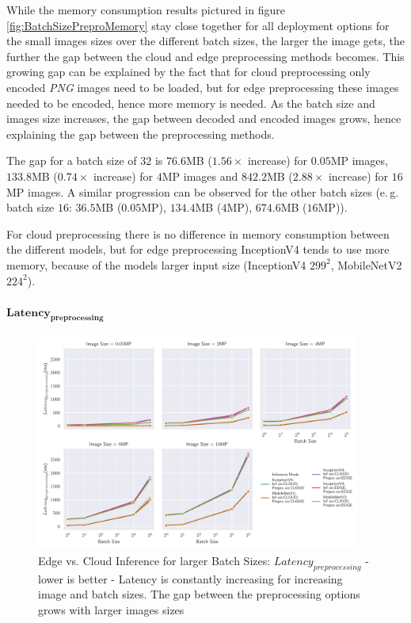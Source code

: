While the memory consumption results pictured in figure \ref{fig:BatchSizePreproMemory} stay close together for all deployment options for the small images sizes over the different batch sizes, the larger the image gets, the further the gap between the cloud and edge preprocessing methods becomes.
This growing gap can be explained by the fact that for cloud preprocessing only encoded \emph{PNG} images need to be loaded, but for edge preprocessing these images needed to be encoded, hence more memory is needed.
As the batch size and images size increases, the gap between decoded and encoded images grows, hence explaining the gap between the preprocessing methods.

The gap for a batch size of $32$ is $76.6$MB ($1.56\times$ increase) for $0.05$MP images, $133.8$MB ($0.74\times$ increase) for $4$MP images and $842.2$MB ($2.88\times$ increase) for $16$MP images. 
A similar progression can be observed for the other batch sizes (e.\,g. batch size $16$: $36.5$MB ($0.05$MP), $134.4$MB ($4$MP), $674.6$MB ($16$MP)).

For cloud preprocessing there is no difference in memory consumption between the different models, but for edge preprocessing InceptionV4 tends to use more memory, because of the models larger input size (InceptionV4 $299^2$, MobileNetV2 $224^2$).


\paragraph{$\mathbf{Latency_{preprocessing}}$}
\begin{figure}[!htb]
\centering
\includegraphics[width=0.95\textwidth]{./Bilder/single_plots/batch_size_plots/Effects_of_Batch_size_Preprocessing_Latencies.pdf}
\caption[Edge vs. Cloud Inference for larger Batch Sizes:  $Latency_{preprocessing}$ - lower is better]{Edge vs. Cloud Inference for larger Batch Sizes:  $Latency_{preprocessing}$ - lower is better - Latency is constantly increasing for increasing image and batch sizes. The gap between the preprocessing options grows with larger images sizes}
\label{fig:BatchSizePreproLatency}
\end{figure}

